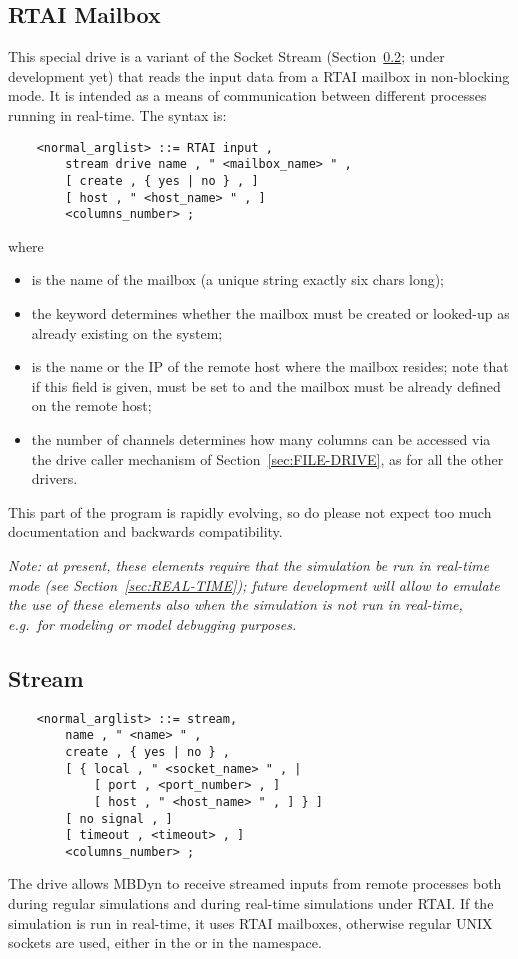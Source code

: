 \subsection{RTAI Mailbox}\label{sec:RTAI_in}
This special drive is a variant of the Socket Stream
(Section~\ref{sec:Stream}; under development yet)
that reads the input data from a RTAI mailbox in non-blocking mode.
It is intended as a means of communication between different processes
running in real-time.
The syntax is:
\begin{verbatim}
    <normal_arglist> ::= RTAI input ,
        stream drive name , " <mailbox_name> " ,
        [ create , { yes | no } , ]
        [ host , " <host_name> " , ]
        <columns_number> ;
\end{verbatim}
where
\begin{itemize}
\item {} is the name of the mailbox (a unique string 
exactly six chars long);
\item the  keyword determines whether the mailbox 
must be created or looked-up as already existing on the system;
\item {} is the name or the IP of the remote host where 
the mailbox resides; note that if this field is given,  must
be set to  and the mailbox must be already defined
on the remote host;
\item the number of channels  determines how many
columns can be accessed via the  drive caller mechanism 
of Section~\ref{sec:FILE-DRIVE}, as for all the other  drivers.
\end{itemize}
This part of the program is rapidly evolving, so do please not expect
too much documentation and backwards compatibility.

\emph{Note: at present, these elements require that the simulation
be run in real-time mode (see Section~\ref{sec:REAL-TIME});
future development will allow to emulate the use of these elements
also when the simulation is not run in real-time, e.g.\ for modeling
or model debugging purposes.}



\subsection{Stream}\label{sec:Stream}
\begin{verbatim}
    <normal_arglist> ::= stream,
        name , " <name> " ,
        create , { yes | no } ,
        [ { local , " <socket_name> " , |
            [ port , <port_number> , ]
            [ host , " <host_name> " , ] } ]
        [ no signal , ]
        [ timeout , <timeout> , ]
        <columns_number> ;
\end{verbatim}
The  drive allows MBDyn to receive streamed inputs 
from remote processes both during regular simulations and during 
real-time simulations under RTAI.
If the simulation is run in real-time, it uses RTAI mailboxes, 
otherwise regular UNIX sockets are used, either in the  or 
in the  namespace.


